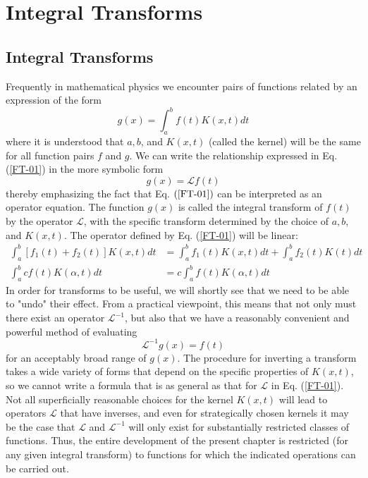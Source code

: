 \chapter{Integral Transforms }
\section{Integral Transforms}
Frequently in mathematical physics we encounter pairs of functions related by an expression of the form
\begin{equation}
g(x)=\int_{a}^{b} f(t) K(x, t) d t\label{FT-01}
\end{equation}
where it is understood that $a, b$, and $K(x, t)$ (called the kernel) will be the same for all function pairs $f$ and $g$. We can write the relationship expressed in Eq. (\ref{FT-01}) in the more symbolic form
\begin{equation}
g(x)=\mathcal{L} f(t)
\end{equation}
thereby emphasizing the fact that Eq. $(\ref{FT-01})$ can be interpreted as an operator equation. The function $g(x)$ is called the integral transform of $f(t)$ by the operator $\mathcal{L}$, with the specific transform determined by the choice of $a, b$, and $K(x, t)$. The operator defined by Eq. (\ref{FT-01}) will be linear:
\begin{align}
\int_{a}^{b}\left[f_{1}(t)+f_{2}(t)\right] K(x, t) d t&=\int_{a}^{b} f_{1}(t) K(x, t) d t+\int_{a}^{b} f_{2}(t) K(t) d t \\
\int_{a}^{b} c f(t) K(\alpha, t) d t&=c \int_{a}^{b} f(t) K(\alpha, t) d t
\end{align}
In order for transforms to be useful, we will shortly see that we need to be able to "undo" their effect. From a practical viewpoint, this means that not only must there exist an operator $\mathcal{L}^{-1}$, but also that we have a reasonably convenient and powerful method of evaluating
\begin{equation}
\mathcal{L}^{-1} g(x)=f(t)
\end{equation}
for an acceptably broad range of $g(x)$. The procedure for inverting a transform takes a wide variety of forms that depend on the specific properties of $K(x, t)$, so we cannot write a formula that is as general as that for $\mathcal{L}$ in Eq. (\ref{FT-01}).\\
Not all superficially reasonable choices for the kernel $K(x, t)$ will lead to operators $\mathcal{L}$ that have inverses, and even for strategically chosen kernels it may be the case that $\mathcal{L}$ and $\mathcal{L}^{-1}$ will only exist for substantially restricted classes of functions. Thus, the entire development of the present chapter is restricted (for any given integral transform) to functions for which the indicated operations can be carried out.\\
